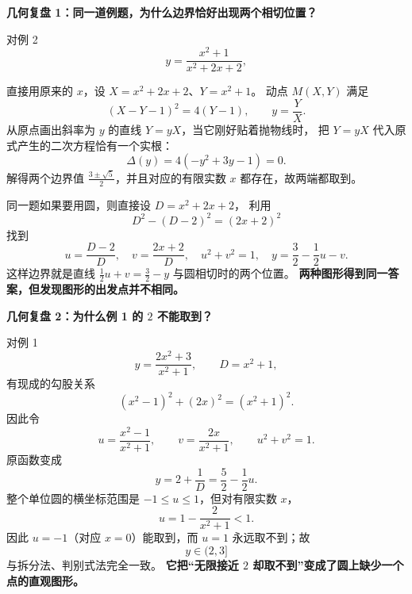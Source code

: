 \clearpage
\begin{examplebox}
  \textbf{\textcolor{CExample}{几何复盘 1：同一道例题，为什么边界恰好出现两个相切位置？}}

  \medskip
  对例 2
  \[
    y=\frac{x^2+1}{x^2+2x+2},
  \]

\begin{center}\end{center}
  直接用原来的 $x$，设 $X=x^2+2x+2$、$Y=x^2+1$。
  动点 $M(X,Y)$ 满足
  \[
    (X-Y-1)^2=4(Y-1),\qquad y=\frac YX.
  \]
  从原点画出斜率为 $y$ 的直线 $Y=yX$，当它刚好贴着抛物线时，
  把 $Y=yX$ 代入原式产生的二次方程恰有一个实根：
  \[
    \Delta(y)=4(-y^2+3y-1)=0.
  \]
  解得两个边界值 $\frac{3\pm\sqrt5}{2}$，并且对应的有限实数 $x$ 都存在，故两端都取到。

  \medskip
\end{examplebox}
\clearpage
\begin{examplebox}

\begin{center}\end{center}
  同一题如果要用圆，则直接设 $D=x^2+2x+2$，
  利用
  \[
    D^2-(D-2)^2=(2x+2)^2
  \]
  找到
  \[
    u=\frac{D-2}{D},\quad v=\frac{2x+2}{D},\quad u^2+v^2=1,
    \quad y=\frac32-\frac12u-v.
  \]
  这样边界就是直线 $\frac12u+v=\frac32-y$ 与圆相切时的两个位置。
  \textbf{两种图形得到同一答案，但发现图形的出发点并不相同。}

  \bigskip
\end{examplebox}
\clearpage
\begin{examplebox}
\textbf{\textcolor{CExample}{几何复盘 2：为什么例 1 的 $2$ 不能取到？}}
\begin{center}\end{center}


  \medskip
  对例 1
  \[
    y=\frac{2x^2+3}{x^2+1},\qquad D=x^2+1,
  \]
  有现成的勾股关系
  \[
    (x^2-1)^2+(2x)^2=(x^2+1)^2.
  \]
  因此令
  \[
    u=\frac{x^2-1}{x^2+1},\qquad v=\frac{2x}{x^2+1},
    \qquad u^2+v^2=1.
  \]
  原函数变成
  \[
    y=2+\frac1D=\frac52-\frac12u.
  \]
  整个单位圆的横坐标范围是 $-1\le u\le1$，但对有限实数 $x$，
  \[
    u=1-\frac2{x^2+1}<1.
  \]
  因此 $u=-1$（对应 $x=0$）能取到，而 $u=1$ 永远取不到；故
  \[
    \boxed{y\in(2,3]}
  \]
  与拆分法、判别式法完全一致。
  \textbf{它把“无限接近 $2$ 却取不到”变成了圆上缺少一个点的直观图形。}
\end{examplebox}


